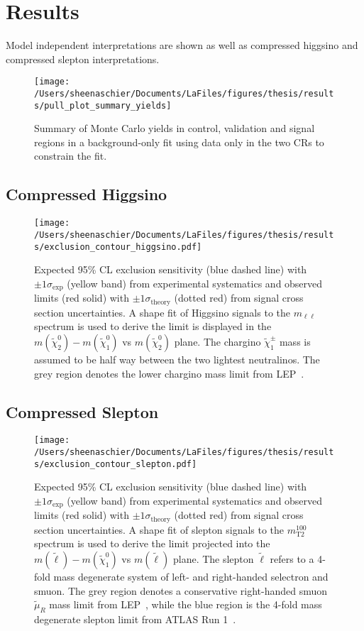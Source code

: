 \chapter{Results}
\label{sec:results}
Model independent interpretations are shown as well as compressed higgsino and compressed slepton interpretations.
\begin{figure}
 \centering
\texttt{[image: /Users/sheenaschier/Documents/LaFiles/figures/thesis/results/pull\_plot\_summary\_yields]}
   \caption{Summary of Monte Carlo yields in control, validation and signal regions in a background-only fit using data only in the two CRs to constrain the fit.}
  \label{fig:pull_plot_summary_yields}
 \end{figure}
\FloatBarrier

\section{Compressed Higgsino}
 \begin{figure}
 \centering
 \texttt{[image: /Users/sheenaschier/Documents/LaFiles/figures/thesis/results/exclusion\_contour\_higgsino.pdf]}
  \caption{
 Expected 95\% CL exclusion sensitivity (blue dashed line) with $\pm 1 \sigma_\text{exp}$ (yellow band) from experimental systematics
   and observed limits (red solid) with $\pm 1 \sigma_\text{theory}$ (dotted red) from signal cross section uncertainties.
A shape fit of Higgsino signals to the $m_{\ell\ell}$ spectrum is used to derive
 the limit is displayed in the $m(\tilde{\chi}^0_2) - m(\tilde{\chi}^0_1)$ vs $m(\tilde{\chi}^0_2)$ plane.
 The chargino $\tilde{\chi}^\pm_1$ mass is assumed to be half way between the two lightest neutralinos.
  The grey region denotes the lower chargino mass limit from LEP~\cite{LEPlimits}.}
   \label{fig:exclusion_contour_higgsino}
 \end{figure}
 \FloatBarrier
 
 \section{Compressed Slepton}
  \begin{figure}
 \centering
 \texttt{[image: /Users/sheenaschier/Documents/LaFiles/figures/thesis/results/exclusion\_contour\_slepton.pdf]}
  \caption{
Expected 95\% CL exclusion sensitivity (blue dashed line) with $\pm 1 \sigma_\text{exp}$ (yellow band) from experimental systematics
and observed limits (red solid) with $\pm 1 \sigma_\text{theory}$ (dotted red) from signal cross section uncertainties.
A shape fit of slepton signals to the $m_\text{T2}^{100}$ spectrum is used to derive
the limit projected into the $m(\tilde{\ell}) - m(\tilde{\chi}^0_1)$ vs $m(\tilde{\ell})$ plane.
The slepton $\tilde{\ell}$ refers to a 4-fold mass degenerate system of left- and right-handed selectron and smuon.
The grey region denotes a conservative right-handed smuon $\tilde{\mu}_R$ mass limit from LEP~\cite{LEPlimits},
while the blue region is the 4-fold mass degenerate slepton limit from ATLAS Run 1~\cite{SUSY-2013-11}.}
   \label{fig:exclusion_contour_slepton}
 \end{figure}
 
